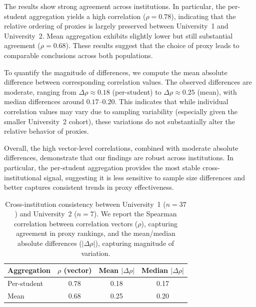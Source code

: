 The results show strong agreement across institutions. In particular, the per-student aggregation yields a high correlation ($\rho = 0.78$), indicating that the relative ordering of proxies is largely preserved between University~1 and University~2. Mean aggregation exhibits slightly lower but still substantial agreement ($\rho = 0.68$). These results suggest that the choice of proxy leads to comparable conclusions across both populations.

To quantify the magnitude of differences, we compute the mean absolute difference between corresponding correlation values. The observed differences are moderate, ranging from $\Delta\rho \approx 0.18$ (per-student) to $\Delta\rho \approx 0.25$ (mean), with median differences around $0.17$--$0.20$. This indicates that while individual correlation values may vary due to sampling variability (especially given the smaller University~2 cohort), these variations do not substantially alter the relative behavior of proxies.

Overall, the high vector-level correlations, combined with moderate absolute differences, demonstrate that our findings are robust across institutions. In particular, the per-student aggregation provides the most stable cross-institutional signal, suggesting it is less sensitive to sample size differences and better captures consistent trends in proxy effectiveness.

\begin{table}[t]
\centering
\caption{Cross-institution consistency between University~1 ($n=37$) and University~2 ($n=7$). We report the Spearman correlation between correlation vectors ($\rho$), capturing agreement in proxy rankings, and the mean/median absolute differences ($|\Delta\rho|$), capturing magnitude of variation.}
\label{tab:cross_institution2}
\begin{tabular}{lccc}
\toprule
\textbf{Aggregation} & \textbf{$\rho$ (vector)} & \textbf{Mean $|\Delta\rho|$} & \textbf{Median $|\Delta\rho|$} \\
\midrule
Per-student & 0.78 & 0.18 & 0.17 \\
Mean        & 0.68 & 0.25 & 0.20 \\
\bottomrule
\end{tabular}
\end{table}
